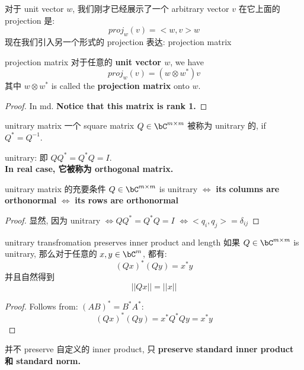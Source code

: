  对于 unit vector $w$, 我们刚才已经展示了一个 arbitrary vector $v$ 在它上面的 projection 是:$$proj_w (v) = <w, v> w  $$
 现在我们引入另一个形式的 projection 表达: projection matrix

\begin{theorem}{projection matrix}
对于任意的 \textbf{unit vector $w$}, we have
$$proj_w (v) = (w \otimes w^*) v $$
其中 $w\otimes w^*$ is called the \textbf{projection matrix} onto $w$.
\end{theorem}
\begin{proof}
    In md.
\textbf{    Notice that this matrix is rank 1.}
\end{proof}


\begin{definition}{unitrary matrix}
一个 square matrix $Q \in \bC^{m\times m}$ 被称为 unitrary 的, if $Q^* = Q^{-1}$.
\end{definition}

\begin{remark}
    unitrary: 即 $QQ^* = Q^*Q = I$. \\
    \textbf{In real case, 它被称为 orthogonal matrix.}
\end{remark}


\begin{theorem}{unitrary matrix 的充要条件}
$Q \in \bC^{m\times m}$ is unitrary $\Longleftrightarrow $ \textbf{its columns are orthonormal} $\Longleftrightarrow$ \textbf{its rows are orthonormal} 
\end{theorem}
\begin{proof}
    显然, 因为 unitrary $\Longleftrightarrow QQ^* = Q^*Q = I$ $\Longleftrightarrow  <q_i, q_j> = \delta_{ij}$
\end{proof}



\begin{theorem}{unitrary transfromation preserves inner product and length}
如果 $Q \in \bC^{m\times m}$ is unitrary, 那么对于任意的 $x,y \in \bC^m$, 都有:
$$
(Qx)^* (Qy) = x^*y
$$
并且自然得到 $$||Qx|| = ||x||
$$
\end{theorem}
\begin{proof}
Follows from: $(AB)^*= B^* A^*$:  $$(Qx)^* (Qy) = x^*Q^*Qy= x^*y
$$
\end{proof}
\begin{remark}
    并不 preserve 自定义的 inner product, 只 \textbf{preserve standard inner product 和 standard norm.}
\end{remark}



